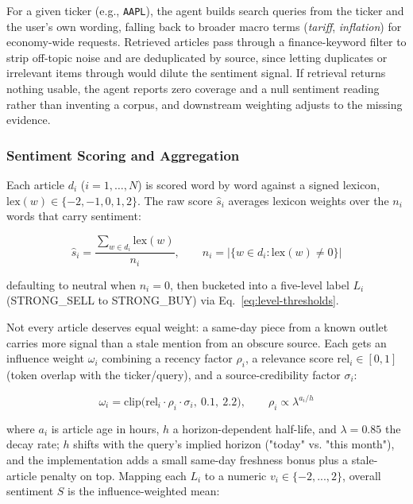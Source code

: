 \documentclass[conference]{IEEEtran}
\begin{document}
For a given ticker (e.g., \texttt{AAPL}), the agent builds search queries from the ticker and the user's own wording, falling back to broader macro terms (\emph{tariff}, \emph{inflation}) for economy-wide requests. Retrieved articles pass through a finance-keyword filter to strip off-topic noise and are deduplicated by source, since letting duplicates or irrelevant items through would dilute the sentiment signal. If retrieval returns nothing usable, the agent reports zero coverage and a null sentiment reading rather than inventing a corpus, and downstream weighting adjusts to the missing evidence.

\subsubsection{Sentiment Scoring and Aggregation}

Each article $d_i$ ($i=1,\dots,N$) is scored word by word against a signed lexicon, $\mathrm{lex}(w)\in\{-2,-1,0,1,2\}$. The raw score $\hat{s}_i$ averages lexicon weights over the $n_i$ words that carry sentiment:

\begin{equation}
\hat{s}_i = \frac{\sum_{w \in d_i}\mathrm{lex}(w)}{n_i}, \qquad n_i = \bigl|\{w \in d_i : \mathrm{lex}(w)\neq 0\}\bigr|
\end{equation}

defaulting to neutral when $n_i=0$, then bucketed into a five-level label $L_i$ (STRONG\_SELL to STRONG\_BUY) via Eq.~\eqref{eq:level-thresholds}.

Not every article deserves equal weight: a same-day piece from a known outlet carries more signal than a stale mention from an obscure source. Each gets an influence weight $\omega_i$ combining a recency factor $\rho_i$, a relevance score $\mathrm{rel}_i \in [0,1]$ (token overlap with the ticker/query), and a source-credibility factor $\sigma_i$:

\begin{equation}
\omega_i = \mathrm{clip}\bigl(\mathrm{rel}_i \cdot \rho_i \cdot \sigma_i,\ 0.1,\ 2.2\bigr), \qquad \rho_i \propto \lambda^{a_i/h}
\end{equation}

where $a_i$ is article age in hours, $h$ a horizon-dependent half-life, and $\lambda=0.85$ the decay rate; $h$ shifts with the query's implied horizon ("today" vs. "this month"), and the implementation adds a small same-day freshness bonus plus a stale-article penalty on top. Mapping each $L_i$ to a numeric $v_i \in \{-2,...,2\}$, overall sentiment $S$ is the influence-weighted mean:
\end{document}

